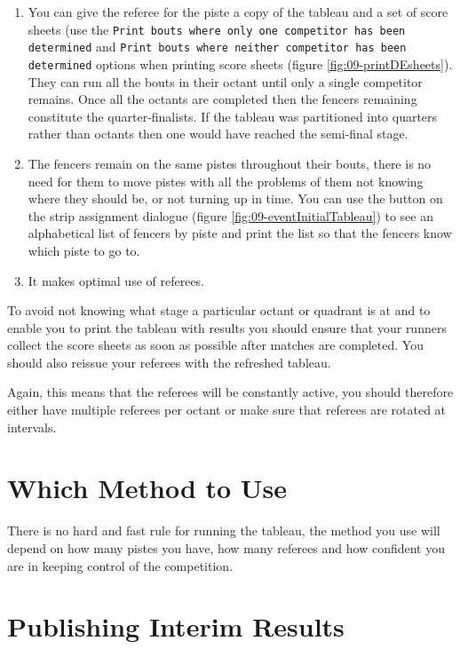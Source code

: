 \documentclass[a4paper,11pt]{memoir}
\begin{document}
\begin{enumerate}
 \item You can give the referee for the piste a copy of the tableau and a set of score sheets (use the \texttt{Print bouts where only one competitor has been determined} and \texttt{Print bouts where neither competitor has been determined} options when printing score sheets (figure \ref{fig:09-printDEsheets}). They can run all the bouts in their octant until only a single competitor remains. Once all the octants are completed then the fencers remaining constitute the quarter-finalists. If the tableau was partitioned into quarters rather than octants then one would have reached the semi-final stage.
 \item The fencers remain on the same pistes throughout their bouts, there is no need for them to move pistes with all the problems of them not knowing where they should be, or not turning up in time. You can use the  button on the \gls{strip} assignment dialogue (figure \ref{fig:09-eventInitialTableau}) to see an alphabetical list of fencers by piste and print the list so that the fencers know which piste to go to.
 \item It makes optimal use of referees.
\end{enumerate}

To avoid not knowing what stage a particular octant or quadrant is at and to enable you to print the tableau with results you should ensure that your runners collect the score sheets as soon as possible after matches are completed. You should also reissue your referees with the refreshed tableau.

Again, this means that the referees will be constantly active, you should therefore either have multiple referees per octant or make sure that referees are rotated at intervals.

\section{Which Method to Use}

There is no hard and fast rule for running the tableau, the method you use will depend on how many pistes you have, how many referees and how confident you are in keeping control of the competition. 

\section{Publishing Interim Results}
\end{document}

